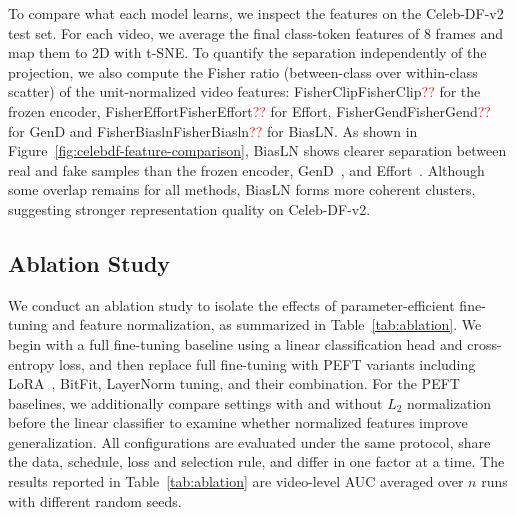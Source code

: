 \documentclass[fonts]{icst}
\newif\ifrevmark\revmarkfalse
\newcommand{\rev}[1]{\ifrevmark{\color{revblue}#1}\else#1\fi}
\newcommand{\num}[1]{\ifcsname #1\endcsname\csname #1\endcsname\else\textcolor{red}{??}\fi}
\begin{document}
To compare what each model learns, we inspect the features on the Celeb-DF-v2 test set. For each \rev{video}, we \rev{average} the \rev{final class-token features of 8 frames} and map them to 2D with t-SNE. \rev{To quantify the separation independently of the projection, we also compute the Fisher ratio (between-class over within-class scatter) of the unit-normalized video features: \num{FisherClip} for the frozen encoder, \num{FisherEffort} for Effort, \num{FisherGend} for GenD and \num{FisherBiasln} for BiasLN.} As shown in Figure~\ref{fig:celebdf-feature-comparison}, BiasLN shows \rev{clearer} separation between real and fake samples than \rev{the frozen encoder}, GenD~\cite{yermakov2025gend}, and Effort~\cite{yan2025effort}. Although some overlap remains for all methods, BiasLN forms more coherent clusters, suggesting stronger representation quality on Celeb-DF-v2.


\subsection{Ablation Study}
\label{sec:ablation}
\label{sec:roles}
We conduct an ablation study to isolate the effects of parameter-efficient fine-tuning and feature normalization, as summarized in Table~\ref{tab:ablation}.
We begin with a full fine-tuning baseline using a linear classification head and cross-entropy loss, and then replace full fine-tuning with PEFT variants including LoRA~\rev{\cite{hu2022lora}}, BitFit, LayerNorm tuning, and their combination.
For the PEFT baselines, we additionally compare settings with and without $L_2$ normalization before the linear classifier to examine whether normalized features improve generalization.
All configurations are evaluated under the same protocol\rev{, share the data, schedule, loss and selection rule, and differ in one factor at a time}. The results reported in Table~\ref{tab:ablation} are video-level AUC \rev{averaged over $n$ runs with different random seeds}.

\begin{table}[t]
  \centering
  \captionsetup{labelsep=period, labelfont=bf, hypcap=false}
  \caption{Ablation study of PEFT variants and the effect of $L_2$ normalization before the linear classifier.
\rev{Video AUC; Avg(D) and Avg(M) are mean $\pm$ standard deviation over $n$ seeds, per-dataset values are seed means. Bold: best; shaded: second best.}}
  \label{tab:ablation}
  \small
  \resizebox{0.85\textwidth}{!}{}
\end{table}
\end{document}
